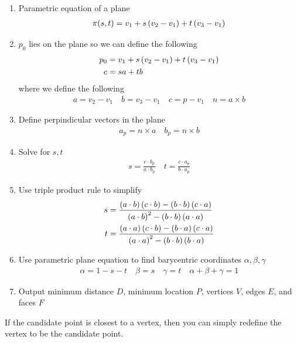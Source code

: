 \begin{enumerate}
    \item Parametric equation of a plane
        \begin{align}
            \pi(s, t) = v_1 + s \left( v_2 - v_1 \right) + t \left( v_3 - v_1 \right)
        \end{align}
    \item \( p_0 \) lies on the plane so we can define the following
        \begin{align}
            p_0 &= v_1 + s \left( v_2 - v_1 \right) + t \left( v_3 - v_1 \right) \\
            c &= s a + t b
        \end{align}
        where we define the following
        \begin{align*}
            a = v_2 - v_1 \quad b= v_3- v_1 \quad c = p - v_1 \quad n = a \times b
        \end{align*}
    \item Define perpindicular vectors in the plane
        \begin{align}
            a_p = n \times a \quad b_p = n \times b
        \end{align}
    \item Solve for \( s, t\)
        \begin{align}
            s = \frac{c \cdot b_p}{a \cdot b_p} \quad t = \frac{c \cdot a_p}{b \cdot a_p}
        \end{align}
    \item Use triple product rule to simplify
        \begin{align}
            s &= \frac{\left( a \cdot b \right)\left( c \cdot b \right)-\left( b \cdot b \right) \left( c \cdot a \right)}{\left( a \cdot b \right)^2 - \left( b \cdot b \right) \left(  a \cdot a \right)} \\
            t &=  \frac{\left( a \cdot a \right)\left( c \cdot b \right)-\left( b \cdot a \right) \left( c \cdot a \right)}{\left( a \cdot a \right)^2 - \left( b \cdot b \right) \left(  b \cdot a \right)} \\
        \end{align} 
    \item Use parametric plane equation to find barycentric coordinates \( \alpha, \beta, \gamma\)
        \begin{align}
            \alpha = 1 - s -t \quad \beta = s \quad \gamma = t \quad \alpha + \beta + \gamma = 1
        \end{align}
    \item Output minimum distance \( D\), minimum location \( P \), vertices \( V \), edges \( E\), and faces \( F \)
\end{enumerate}
If the candidate point is closest to a vertex, then you can simply redefine the vertex to be the candidate point.




